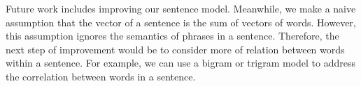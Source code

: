 \documentclass[conference,compsoc]{IEEEtran}
\begin{document}
  Future work includes improving our sentence model. Meanwhile, we make a naive assumption that the vector of a sentence is the sum of vectors of words. However, this assumption ignores the semantics of phrases in a sentence. Therefore, the next step of improvement would be to consider more of relation between words within a sentence. For example, we can use a bigram or trigram model to address the correlation between words in a sentence. 



%
%



%
%
\end{document}
